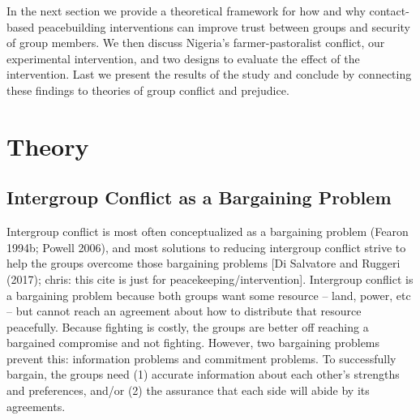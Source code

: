 \documentclass[11pt]{article}
\begin{document}
In the next section we provide a theoretical framework for how and why
contact-based peacebuilding interventions can improve trust between
groups and security of group members. We then discuss Nigeria's
farmer-pastoralist conflict, our experimental intervention, and two
designs to evaluate the effect of the intervention. Last we present the
results of the study and conclude by connecting these findings to
theories of group conflict and prejudice.

\hypertarget{theory}{%
\section{Theory}\label{theory}}

\hypertarget{intergroup-conflict-as-a-bargaining-problem}{%
\subsection{Intergroup Conflict as a Bargaining
Problem}\label{intergroup-conflict-as-a-bargaining-problem}}

Intergroup conflict is most often conceptualized as a bargaining problem
(Fearon 1994b; Powell 2006), and most solutions to reducing intergroup
conflict strive to help the groups overcome those bargaining problems
{[}Di Salvatore and Ruggeri (2017); chris: this cite is just for
peacekeeping/intervention{]}. Intergroup conflict is a bargaining
problem because both groups want some resource -- land, power, etc --
but cannot reach an agreement about how to distribute that resource
peacefully. Because fighting is costly, the groups are better off
reaching a bargained compromise and not fighting. However, two
bargaining problems prevent this: information problems and commitment
problems. To successfully bargain, the groups need (1) accurate
information about each other's strengths and preferences, and/or (2) the
assurance that each side will abide by its agreements.
\end{document}
